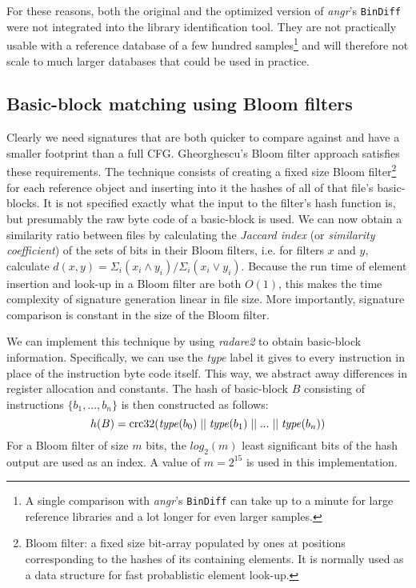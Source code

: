 \documentclass[twocolumn,a4paper]{IEEEtran} %
\begin{document}
For these reasons, both the original and the optimized version of \emph{angr}'s \texttt{BinDiff} were not integrated into the library identification tool. They are not practically usable with a reference database of a few hundred samples\footnote{A single comparison with \emph{angr}'s \texttt{BinDiff} can take up to a minute for large reference libraries and a lot longer for even larger samples.} and will therefore not scale to much larger databases that could be used in practice.


\subsection{Basic-block matching using Bloom filters}
\label{sec:tech-bloom}
Clearly we need signatures that are both quicker to compare against and have a smaller footprint than a full CFG. Gheorghescu's Bloom filter approach \cite{Gheorghescu2005} satisfies these requirements. The technique consists of creating a fixed size Bloom filter\footnote{Bloom filter: a fixed size bit-array populated by ones at positions corresponding to the hashes of its containing elements. It is normally used as a data structure for fast probablistic element look-up.} \cite{bloom1970space} for each reference object and inserting into it the hashes of all of that file's basic-blocks. It is not specified exactly what the input to the filter's hash function is, but presumably the raw byte code of a basic-block is used. We can now obtain a similarity ratio between files by calculating the \emph{Jaccard index} (or \emph{similarity coefficient}) of the sets of bits in their Bloom filters, i.e. for filters $x$ and $y$, calculate $d(x,y) = \Sigma_i (x_i \wedge y_i) / \Sigma_i (x_i \vee y_i)$. Because the run time of element insertion and look-up in a Bloom filter are both $O(1)$, this makes the time complexity of signature generation linear in file size. More importantly, signature comparison is constant in the size of the Bloom filter.

We can implement this technique by using \emph{radare2} to obtain basic-block information. Specifically, we can use the \emph{type} label it gives to every instruction in place of the instruction byte code itself. This way, we abstract away differences in register allocation and constants. The hash of basic-block $B$ consisting of instructions $\{b_1,...,b_n\}$ is then constructed as follows:
$$ h(B) = \text{crc32}(\text{\emph{type}}(b_0)\;||\;\text{\emph{type}}(b_1)\;||\;...\;||\;\text{\emph{type}}(b_n)) $$
For a Bloom filter of size $m$ bits, the $log_2(m)$ least significant bits of the hash output are used as an index. A value of $m=2^{15}$ is used in this implementation.
\end{document}
